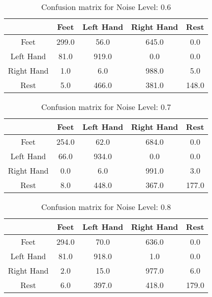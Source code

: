 \begin{table}[!htbp]
    \centering
    \begin{tabular}{|c||c|c|c|c|}
        \hline
		 & Feet & Left Hand & Right Hand & Rest \\
        \hline
        \hline
        Feet & 299.0 & 56.0 & 645.0 & 0.0 \\
        \hline
        Left Hand & 81.0 & 919.0 & 0.0 & 0.0 \\
        \hline
        Right Hand & 1.0 & 6.0 & 988.0 & 5.0 \\
        \hline
        Rest & 5.0 & 466.0 & 381.0 & 148.0 \\
        \hline
    \end{tabular}
    \caption{Confusion matrix for Noise Level: 0.6}
\end{table}

\begin{table}[!htbp]
    \centering
    \begin{tabular}{|c||c|c|c|c|}
        \hline
		 & Feet & Left Hand & Right Hand & Rest \\
        \hline
        \hline
        Feet & 254.0 & 62.0 & 684.0 & 0.0 \\
        \hline
        Left Hand & 66.0 & 934.0 & 0.0 & 0.0 \\
        \hline
        Right Hand & 0.0 & 6.0 & 991.0 & 3.0 \\
        \hline
        Rest & 8.0 & 448.0 & 367.0 & 177.0 \\
        \hline
    \end{tabular}
    \caption{Confusion matrix for Noise Level: 0.7}
\end{table}

\begin{table}[!htbp]
    \centering
    \begin{tabular}{|c||c|c|c|c|}
        \hline
		 & Feet & Left Hand & Right Hand & Rest \\
        \hline
        \hline
        Feet & 294.0 & 70.0 & 636.0 & 0.0 \\
        \hline
        Left Hand & 81.0 & 918.0 & 1.0 & 0.0 \\
        \hline
        Right Hand & 2.0 & 15.0 & 977.0 & 6.0 \\
        \hline
        Rest & 6.0 & 397.0 & 418.0 & 179.0 \\
        \hline
    \end{tabular}
    \caption{Confusion matrix for Noise Level: 0.8}
\end{table}

